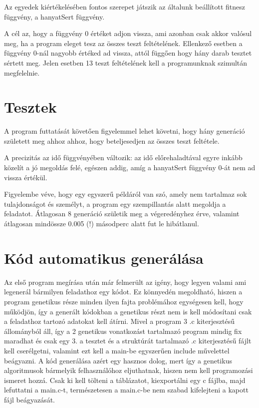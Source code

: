 \documentclass[12pt,a4paper,oneside]{report}
\begin{document}
	Az egyedek kiértékelésében fontos szerepet játszik az általunk beállított fitnesz függvény, a hanyatSert függvény.


	{A cél az, hogy a függvény 0 értéket adjon vissza, ami azonban csak akkor valósul meg, ha a program eleget tesz az összes teszt feltételének.}
	Ellenkező esetben a függvény 0-nál nagyobb értéked ad vissza, attól függően hogy hány darab tesztet sértett meg.
	Jelen esetben 13 teszt feltételének kell a programunknak szimultán megfelelnie.

	

\chapter{Tesztek} %
	A program futtatását követően figyelemmel lehet követni, hogy hány generáció született meg ahhoz ahhoz, hogy beteljesedjen az összes teszt feltétele.


	A precizitás az idő függvényében változik: az idő előrehaladtával egyre inkább közelít a jó megoldás felé, egészen addig, amíg a hanyatSert függvény 0-át nem ad vissza értékül.


	Figyelembe véve, hogy egy egyszerű példáról van szó, amely nem tartalmaz sok tulajdonságot és személyt, a program egy szempillantás alatt megoldja a feladatot.
	Átlagosan 8 generáció születik meg a végeredényhez érve, valamint átlagosan mindössze 0.005 (!) másodperc alatt fut le hibátlanul.

\chapter{Kód automatikus generálása} %
    Az első program megírása után már felmerült az igény, hogy legyen valami ami legenerál bármilyen feladathoz egy kódot.
    Ez könnyedén megoldható, hiszen a program genetikus része minden ilyen fajta problémához egységesen kell, hogy működjön, így a generált kódokban a genetikus részt nem is kell módosítani csak a feladathoz tartozó adatokat kell átírni.
    Mivel a program 3 .c kiterjesztésű állományból áll, így a 2 genetikus vonatkozást tartalmazó program mindig fix maradhat és csak egy 3. a tesztet és a struktúrát tartalmazó .c kiterjesztésű fájlt kell cserélgetni, valamint ezt kell a main-be egyszerűen include művelettel beágyazni.
    A kód generálása azért egy hasznos dolog, mert így a genetikus algoritmusok bármelyik felhasználóhoz eljuthatnak, hiszen nem kell programozási ismeret hozzá.
    Csak ki kell tölteni a táblázatot, kiexportálni egy c fájlba, majd lefuttatni a main.c-t, természetesen a main.c-be nem szabad kifelejteni a kapott fájl beágyazását.
    
\end{document}
